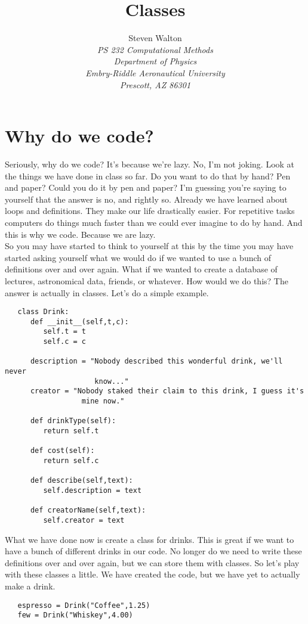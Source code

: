 \documentclass[11pt]{article}   %
\title{Classes}
\author{Steven Walton\\     %
\textit{PS 232 Computational Methods}\\
\textit{Department of Physics}\\
\textit{Embry-Riddle Aeronautical University}\\
\textit{Prescott, AZ   86301}}
\begin{document}
\maketitle
\section*{Why do we code?}
Seriously, why do we code?  It's because we're lazy.  No, I'm not joking.  Look at the things we have done in class so far.  Do you want to do that by hand?
Pen and paper?  Could you do it by pen and paper?  I'm guessing you're saying to yourself that the answer is no, and rightly so.  Already we have learned
about loops and definitions.  They make our life drastically easier.  For repetitive tasks computers do things much faster than we could ever imagine to do
by hand.  And this is why we code.  Because we are lazy.  
\\
So you may have started to think to yourself at this by the time you may have started asking yourself what we would do if we wanted to use a bunch of 
definitions over and over again.  What if we wanted to create a database of lectures, astronomical data, friends, or whatever.  How would we do this?
The answer is actually in classes.  Let's do a simple example.  
\begin{tcolorbox}
   \begin{lstlisting}
   class Drink:
      def __init__(self,t,c):
         self.t = t
         self.c = c

      description = "Nobody described this wonderful drink, we'll never 
                     know..."
      creator = "Nobody staked their claim to this drink, I guess it's 
                  mine now."

      def drinkType(self):
         return self.t

      def cost(self):
         return self.c

      def describe(self,text):
         self.description = text

      def creatorName(self,text):
         self.creator = text
   \end{lstlisting}
\end{tcolorbox}
What we have done now is create a class for drinks.  This is great if we want to have a bunch of different drinks in our code.  No longer do we need to 
write these definitions over and over again, but we can store them with classes.  So let's play with these classes a little.  We have created the code, but 
we have yet to actually make a drink.
\begin{tcolorbox}
   \begin{lstlisting}
   espresso = Drink("Coffee",1.25)
   few = Drink("Whiskey",4.00)
   \end{lstlisting}
\end{tcolorbox}
\end{document}

